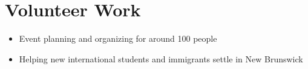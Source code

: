 \section{ Volunteer Work }

 {}{}{%
\begin{itemize}
\item Event planning and organizing for around 100 people
\item Helping new international students and immigrants settle in New Brunswick
\end{itemize}}